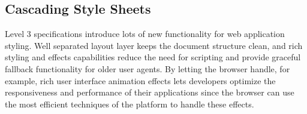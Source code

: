 \subsection{Cascading Style Sheets}
\label{section:css}

 Level 3 specifications introduce lots of new functionality
for web application styling. Well separated layout layer keeps the
document structure clean, and rich styling and effects capabilities
reduce the need for scripting and provide graceful fallback
functionality for older user agents. By letting the browser handle,
for example, rich user interface animation effects lets developers
optimize the responsiveness and performance of their applications
since the browser can use the most efficient techniques of the
platform to handle these effects.


